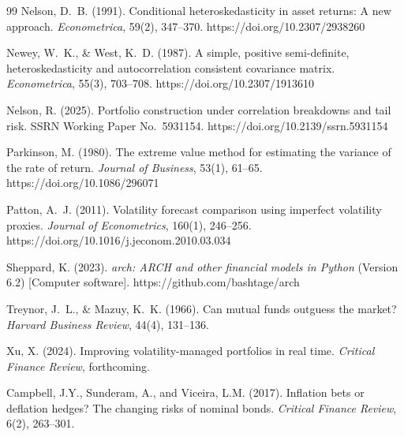 \documentclass[12pt,a4paper]{article}
\begin{document}
\begin{thebibliography}{99}
Nelson, D.~B. (1991). Conditional heteroskedasticity in asset returns: A new approach. \textit{Econometrica}, 59(2), 347--370. https://doi.org/10.2307/2938260

Newey, W.~K., \& West, K.~D. (1987). A simple, positive semi-definite, heteroskedasticity and autocorrelation consistent covariance matrix. \textit{Econometrica}, 55(3), 703--708. https://doi.org/10.2307/1913610

Nelson, R. (2025). Portfolio construction under correlation breakdowns and tail risk. SSRN Working Paper No.~5931154. https://doi.org/10.2139/ssrn.5931154

Parkinson, M. (1980). The extreme value method for estimating the variance of the rate of return. \textit{Journal of Business}, 53(1), 61--65. https://doi.org/10.1086/296071

Patton, A.~J. (2011). Volatility forecast comparison using imperfect volatility proxies. \textit{Journal of Econometrics}, 160(1), 246--256. https://doi.org/10.1016/j.jeconom.2010.03.034

Sheppard, K. (2023). \textit{arch: ARCH and other financial models in Python} (Version 6.2) [Computer software]. https://github.com/bashtage/arch

Treynor, J.~L., \& Mazuy, K.~K. (1966). Can mutual funds outguess the market? \textit{Harvard Business Review}, 44(4), 131--136.

Xu, X. (2024). Improving volatility-managed portfolios in real time. \textit{Critical Finance Review}, forthcoming.

Campbell, J.Y., Sunderam, A., and Viceira, L.M. (2017). Inflation bets or deflation hedges? The changing risks of nominal bonds. \textit{Critical Finance Review}, 6(2), 263--301.

\end{thebibliography}
\end{document}
